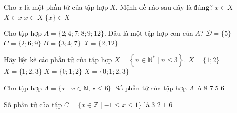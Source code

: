 



\begin{ex}
Cho $x$ là một phần tử của tập hợp $X$. Mệnh đề nào sau đây là $\textbf{đúng}$?
\choice
{\True $x \in X$}
{$X \in x$}
{$x \subset X$}
{$\{x\} \in X$}
\end{ex}

\begin{ex}
Cho tập hợp $A=\{2;4;7;8;9;12\}$. Đâu là một tập hợp con của $A$?
\choice
{$\mathscr{D}=\{5\}$}
{$C=\{2;6;9\}$}
{$B=\{3;4;7\}$}
{\True $X=\{2;12\}$}
\end{ex}

\begin{ex}
Hãy liệt kê các phần tử của tập hợp $X=\left\{n \in \mathbb{N}^{*} \mid n \leq 3\right\}$.
\choice
{$X=\{1 ; 2\}$}
{\True $X=\{1 ; 2 ; 3\}$}
{$X=\{0 ; 1 ; 2\}$}
{$X=\{0 ; 1 ; 2 ; 3\}$}
\end{ex}

\begin{ex}
Cho tập hợp $A=\{x \mid x \in \mathbb{N}, x \leq 6\}$. Số phần tử của tập hợp $A$ là
\choice
{$8$}
{\True $7$}
{$5$}
{$6$}
\end{ex}

\begin{ex}
Số phần tử của tập $C=\{ x \in \mathbb{Z} \mid -1 \leq x \leq 1\}$ là
\choice
{\True $3$}
{$2$}
{$1$}
{$6$}
\end{ex}


